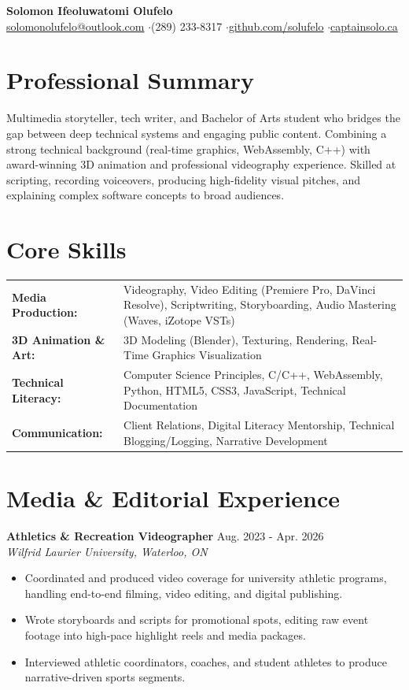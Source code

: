 \documentclass[a4paper,10pt]{article}
\begin{document}
\begin{center}
    {\LARGE \textbf{Solomon Ifeoluwatomi Olufelo}} \\[2pt]
    \href{mailto:solomonolufelo@outlook.com}{solomonolufelo@outlook.com} \enspace$\cdot$\enspace (289) 233-8317 \enspace$\cdot$\enspace \href{https://github.com/solufelo}{github.com/solufelo} \enspace$\cdot$\enspace \href{https://captainsolo.ca}{captainsolo.ca}
\end{center}

\section*{Professional Summary}
Multimedia storyteller, tech writer, and Bachelor of Arts student who bridges the gap between deep technical systems and engaging public content. Combining a strong technical background (real-time graphics, WebAssembly, C++) with award-winning 3D animation and professional videography experience. Skilled at scripting, recording voiceovers, producing high-fidelity visual pitches, and explaining complex software concepts to broad audiences.

\section*{Core Skills}
\begin{tabularx}{\textwidth}{@{}lX@{}}
\textbf{Media Production:} & Videography, Video Editing (Premiere Pro, DaVinci Resolve), Scriptwriting, Storyboarding, Audio Mastering (Waves, iZotope VSTs) \\
\textbf{3D Animation \& Art:} & 3D Modeling (Blender), Texturing, Rendering, Real-Time Graphics Visualization \\
\textbf{Technical Literacy:} & Computer Science Principles, C/C++, WebAssembly, Python, HTML5, CSS3, JavaScript, Technical Documentation \\
\textbf{Communication:} & Client Relations, Digital Literacy Mentorship, Technical Blogging/Logging, Narrative Development \\
\end{tabularx}

\section*{Media \& Editorial Experience}
\textbf{Athletics \& Recreation Videographer} \hfill Aug. 2023 - Apr. 2026 \\
\textit{Wilfrid Laurier University, Waterloo, ON}
\begin{itemize}
    \item Coordinated and produced video coverage for university athletic programs, handling end-to-end filming, video editing, and digital publishing.
    \item Wrote storyboards and scripts for promotional spots, editing raw event footage into high-pace highlight reels and media packages.
    \item Interviewed athletic coordinators, coaches, and student athletes to produce narrative-driven sports segments.
\end{itemize}
\end{document}

